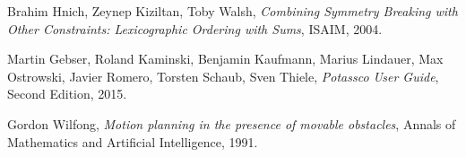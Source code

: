 \documentclass{report}
\begin{document}
\begin{thebibliography}{}
Brahim Hnich, Zeynep Kiziltan, Toby Walsh,
\textit{Combining Symmetry Breaking with Other Constraints: Lexicographic Ordering with Sums},
ISAIM, 2004.

Martin Gebser, Roland Kaminski, Benjamin Kaufmann, Marius Lindauer, Max Ostrowski, Javier Romero, Torsten Schaub, Sven Thiele,
\textit{Potassco User Guide},
Second Edition, 2015.

Gordon Wilfong,
\textit{Motion planning in the presence of movable obstacles},
Annals of Mathematics and Artificial Intelligence, 1991.
\end{thebibliography}
\end{document}
